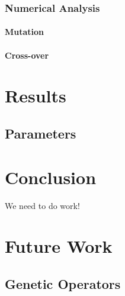 \documentclass{acm_proc_article-sp}
\begin{document}
        \subsubsection{Numerical Analysis}
        
            \paragraph{Mutation}
            \paragraph{Cross-over}
            
\section{Results}
    
    \subsection{Parameters}

\section{Conclusion}

	We need to do work!
    
\section{Future Work}

    \subsection{Genetic Operators}


%


\begin{thebibliography}{1}


\end{thebibliography}


\balancecolumns
\end{document}
